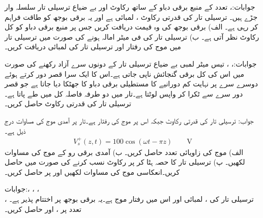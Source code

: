 جوابات:، 
تعدد  کے منبع برقی دباو کے ساتھ رکاوٹ  اور بے ضیاع ترسیلی تار سلسلہ وار جڑے ہیں۔ ترسیلی تار کی قدرتی رکاوٹ ، لمبائی  ہے اور یہ برقی بوجھ  کو طاقت فراہم کر رہی ہے۔ الف) برقی بوجھ کی وہ قیمت دریافت کریں جس پر منبع برقی دباو کو کل  رکاوٹ نظر آتی ہے۔ ب) ترسیلی تار کی فی میٹر امالہ  ہونے کی صورت میں ترسیلی تار میں موج کی رفتار اور ترسیلی تار کی لمبائی دریافت کریں۔ 

جوابات:، ، 
تیس میٹر لمبی بے ضیاع ترسیلی تار کے دونوں سرے آزاد رکھنے کی صورت میں اس کی کل برقی گنجائش  ناپی جاتی ہے۔اس کا ایک سرا قصر دور کرتے ہوئے دوسرے سرے پر نہایت کم دورانیے کا مستطیلی برقی دباو کا جھٹکا دیا جاتا ہے جو قصر دور سرے سے ٹکرا کر واپس لوٹتا ہے۔تار میں دو طرفہ فاصلہ کل  میں طے پاتا ہے۔ترسیلی تار کی قدرتی رکاوٹ حاصل کریں۔

جواب:  
ترسیلی تار کی قدرتی رکاوٹ  جبکہ اس پر موج کی رفتار  ہے۔تار پر آمدی موج کی مساوات درج ذیل ہے۔
\begin{align*}
V_s^{+}(z,t)=100 \cos(\omega t -\pi z) \quad \quad  \si{\volt}
\end{align*}
 الف) موج کی زاویائی تعدد حاصل کریں۔ ب) آمدی برقی رو کے موج کی مساوات لکھیں۔ پ) ترسیلی تار کا  حصہ ہٹا کر  پر  رکاوٹ نسب کرنے کی صورت میں  حاصل کریں۔انعکاسی موج  کی مساوات لکھیں اور  پر  حاصل کریں۔

جوابات:، ،
 ، \\
، 
ترسیلی تار کی ، لمبائی  اور اس میں رفتار موج  ہے۔یہ  برقی بوجھ پر اختتام پذیر ہے۔تعدد  پر  ،  اور  حاصل کریں۔

